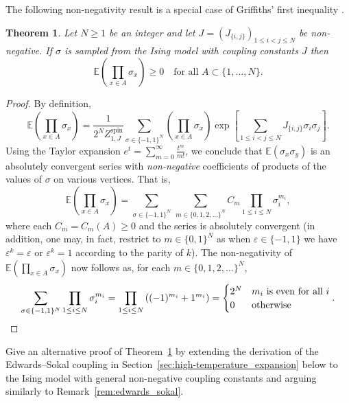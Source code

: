 \documentclass[12pt,reqno]{article}
\def\E{\mathbb{E}}
\newtheorem{theorem}{Theorem}[section]
\def\eps{\varepsilon}
\begin{document}
The following non-negativity result is a special case of Griffiths' first
inequality \cite{Gri67}.
\begin{theorem}\label{thm:Griffiths_first_inequality}
  Let $N\ge 1$ be an integer and let $J = (J_{\{i,j\}})_{1\le i<j\le N}$ be non-negative.
  If $\sigma$ is sampled from the Ising model with coupling constants $J$ then
  \begin{equation*}
     \E\left(\prod_{x \in A}\sigma_x \right)\ge 0\quad\text{for all $A \subset \{1,\dots,N\}$}.
  \end{equation*}
\end{theorem}
\begin{proof}
  By definition,
  \begin{equation*}
    \E\left(\prod_{x \in A}\sigma_x\right) =
    \frac{1}{2^{N}Z^{\text{spin}}_{1,J}}\sum_{\sigma\in
    \{-1,1\}^{N}} \left(\prod_{x \in A}\sigma_x\right) \exp \left[\sum_{1\le i<j\le N} J_{\{i,j\}} \sigma_i \sigma_j\right].
  \end{equation*}
  Using the Taylor expansion $e^t = \sum_{m=0}^{\infty}
  \frac{t^m}{m!}$, we conclude that $\E(\sigma_x \sigma_y)$ is an absolutely convergent series
  with \emph{non-negative} coefficients of products of
  the values of $\sigma$ on various vertices. That is,
  \begin{equation*}
    \E\left(\prod_{x \in A}\sigma_x\right) = \sum_{\sigma\in
    \{-1,1\}^{N}}\, \sum_{{m\in \{0,1,2,\ldots\}}^{N}} C_m \prod_{1\le i\le N} \sigma_i^{m_i},
  \end{equation*}
  where each $C_m=C_m(A)\ge 0$ and the series is absolutely convergent (in addition, one may, in fact, restrict to $m\in\{0,1\}^{N}$ as when $\eps\in\{-1,1\}$
  we have $\eps^k = \eps$ or $\eps^k = 1$ according to the parity of
  $k$). The non-negativity of $\E(\prod_{x \in A}\sigma_x)$ now follows as, for each
  $m\in \{0,1,2,\ldots\}^{N}$,
  \begin{equation*}
    \sum_{\sigma\in\{-1,1\}^{N}} \prod_{1\le i\le N} \sigma_i^{m_i} = \prod_{1\le i \le N} \left((-1)^{m_i} + 1^{m_i}\right) = \begin{cases}2^{N} & \text{$m_i$ is
    even for all $i$}\\0&\text{otherwise}\end{cases}.\qedhere
  \end{equation*}
\end{proof}
\medbreak
{}
Give an alternative proof of Theorem~\ref{thm:Griffiths_first_inequality} by extending the derivation of the Edwards--Sokal coupling in Section~\ref{sec:high-temperature_expansion} below to the Ising model with general non-negative coupling constants and arguing similarly to Remark~\ref{rem:edwards_sokal}.
\end{document}
